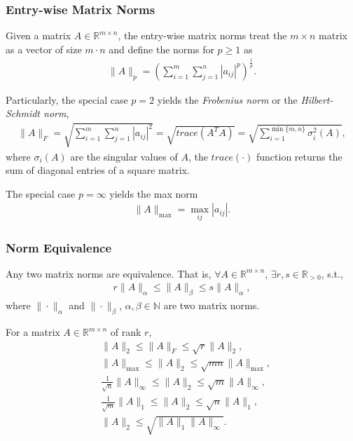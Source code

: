 \subsubsection*{Entry-wise Matrix Norms}
Given a matrix $A \in \mathbb{R}^{m \times n}$, the entry-wise matrix norms treat
the $m \times n$ matrix as a vector of size $m \cdot n$ and define the norms for $p \geq 1$ as
\begin{align*}
\| A \|_p = \left( \sum_{i = 1}^m \sum_{j = 1}^n  | a_{ij}|^p \right)^{\frac{1}{p}}.
\end{align*}

Particularly, the special case $p = 2$ yields the \emph{Frobenius norm} or the \emph{Hilbert-Schmidt norm},
\begin{align*}
\| A \|_F = \sqrt{ \sum_{i = 1}^m \sum_{j = 1}^n  | a_{ij}|^2 } = \sqrt{ trace(A^T A) } = \sqrt{ \sum_{i = 1}^{ \min\{m,n\} } \sigma_i^2 (A) },
\end{align*}
where  $ \sigma _{i}(A) $  are the singular values of $A$,  the $trace(\cdot)$ function returns the sum of diagonal entries of a square matrix.

The special case $p = \infty$ yields the max norm
\begin{align*}
\|A\|_{\max} = \max_{ij} |a_{ij}|.
\end{align*}


\subsubsection*{Norm Equivalence}

Any two matrix norms are equivalence. That is, $\forall A \in \mathbb{R}^{m \times n} $, $\exists r, s \in \mathbb{R}_{>0}$, s.t.,
\begin{align*}
 r \|A \|_\alpha \leq  \|A \|_\beta \leq s \|A \|_\alpha,
\end{align*}
where $\|\cdot \|_{\alpha }$ and $ \|\cdot\|_{\beta}$, $\alpha, \beta \in \mathbb{N}$ are two matrix norms.

For a matrix $A \in \mathbb{R}^{m \times n}$ of rank $r$,
\begin{align*}
& \|A\|_2  \leq \| A\|_F \leq \sqrt{r} \| A\|_2, \\
& \|A\|_{\max} \leq \|A\|_2 \leq \sqrt{mn}\|A\|_{\max}, \\
&  \frac {1}{\sqrt {n}} \|A\|_{\infty } \leq \|A\|_2 \leq \sqrt {m} \|A\|_{\infty }, \\
&  \frac {1}{\sqrt {m}} \|A\|_1 \leq \|A\|_2 \leq \sqrt {n} \|A\|_1, \\
& \|A\|_2  \leq  \sqrt {\|A\|_1 \|A\|_{\infty }}.
\end{align*}


